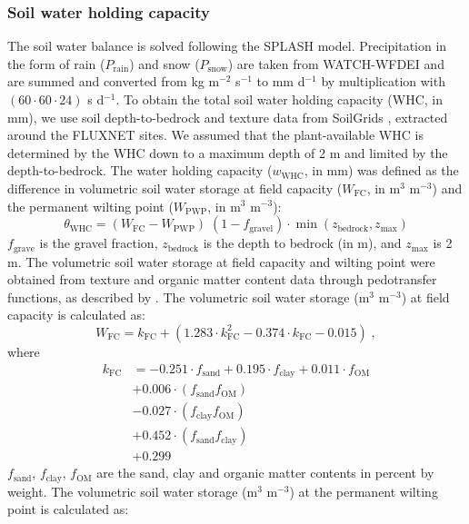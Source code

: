 \documentclass{myreport}
\begin{document}
\subsubsection{Soil water holding capacity}
\label{sec:whc}
The soil water balance is solved following the SPLASH model. Precipitation in the form of rain ($P_{\text{rain}}$) and snow ($P_{\text{snow}}$) are taken from WATCH-WFDEI \citep{Weedon2014-nv} and are summed and converted from kg m$^{-2}$ s$^{-1}$ to mm d$^{-1}$ by multiplication with $(60 \cdot 60 \cdot 24)$ s d$^{-1}$. To obtain the total soil water holding capacity (WHC, in mm), we use soil depth-to-bedrock and texture data from SoilGrids \citep{Hengl2014-jm}, extracted around the FLUXNET sites. We assumed that the plant-available WHC is determined by the WHC down to a maximum depth of 2 m and limited by the depth-to-bedrock. The water holding capacity ($w_\text{WHC}$, in mm) was defined as the difference in volumetric soil water storage at field capacity ($W_{\text{FC}}$, in m$^3$ m$^{-3}$) and the permanent wilting point ($W_{\text{PWP}}$, in m$^3$ m$^{-3}$):
\begin{equation}
\theta_\text{WHC} = (W_{\text{FC}} - W_{\text{PWP}}) \; (1-f_\text{gravel})\cdot \min(z_\text{bedrock}, z_\text{max})
\end{equation}
$f_\text{grave}$ is the gravel fraction, $z_\text{bedrock}$ is the depth to bedrock (in m), and $z_\text{max}$ is 2 m. The volumetric soil water storage at field capacity and wilting point were obtained from texture and organic matter content data through pedotransfer functions, as described by \citet{saxton06}. The volumetric soil water storage (m$^3$ m$^{-3}$) at field capacity is calculated as:
\begin{equation}
W_{\text{FC}}= k_\text{FC}+(1.283\cdot k_\text{FC}^{2}-0.374\cdot k_\text{FC}-0.015)\;, 
\end{equation}
where
\begin{align}
k_\text{FC} &=-0.251\cdot f_{\text{sand}} + 0.195\cdot f_{\text{clay}} + 0.011\cdot f_{\text{OM}}\\                            
&+ 0.006\cdot (f_{\text{sand}} f_{\text{OM}})\\
&- 0.027\cdot (f_{\text{clay}} f_{\text{OM}})\\
&+ 0.452\cdot (f_{\text{sand}} f_{\text{clay}})\\
&+ 0.299
\end{align}
$f_{\text{sand}}$, $f_{\text{clay}}$, $f_{\text{OM}}$ are the sand, clay and organic matter contents in percent by weight. The volumetric soil water storage (m$^3$ m$^{-3}$) at the permanent wilting point is calculated as:
\end{document}
